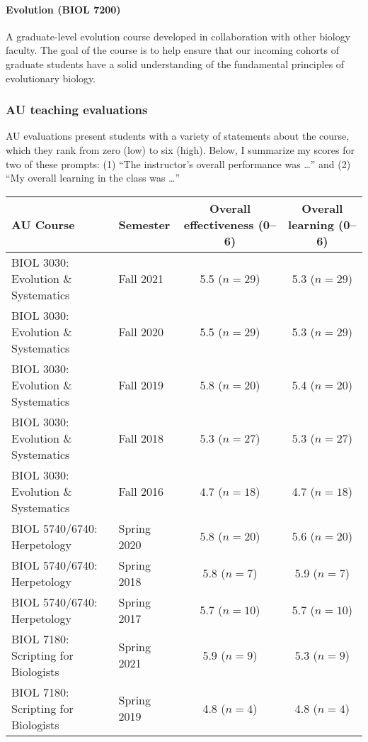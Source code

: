 \paragraph*{Evolution (BIOL 7200)}
A graduate-level evolution course developed in collaboration with other biology
faculty.
The goal of the course is to help ensure that our incoming cohorts of graduate
students have a solid understanding of the fundamental principles of
evolutionary biology.

\subsubsection*{AU teaching evaluations}
AU evaluations present students with a variety of statements about the
course,
which they rank from zero (low) to six (high).
Below, I summarize my scores for two of these prompts:
(1) ``The instructor's overall performance was \ldots''
and
(2) ``My overall learning in the class was \ldots''
\vspace{0.1ex}
\begin{center}
    \sffamily\footnotesize
\begin{tabular}{l l c c}
    \hline
    \textbf{AU Course} & \textbf{Semester} & \textbf{Overall effectiveness} (0--6) & \textbf{Overall learning} (0--6) \\
    \hline
    BIOL 3030: Evolution \& Systematics & Fall 2021 & 5.5 ($n = 29$) & 5.3 ($n = 29$) \\
    BIOL 3030: Evolution \& Systematics & Fall 2020 & 5.5 ($n = 29$) & 5.3 ($n = 29$) \\
    BIOL 3030: Evolution \& Systematics & Fall 2019 & 5.8 ($n = 20$) & 5.4 ($n = 20$) \\
    BIOL 3030: Evolution \& Systematics & Fall 2018 & 5.3 ($n = 27$) & 5.3 ($n = 27$) \\
    BIOL 3030: Evolution \& Systematics & Fall 2016 & 4.7 ($n = 18$) & 4.7 ($n = 18$) \\
    \hline
    BIOL 5740/6740: Herpetology & Spring 2020 & 5.8 ($n = 20$) & 5.6 ($n = 20$) \\
    BIOL 5740/6740: Herpetology & Spring 2018 & 5.8 ($n = 7$) & 5.9 ($n = 7$) \\
    BIOL 5740/6740: Herpetology & Spring 2017 & 5.7 ($n = 10$) & 5.7 ($n = 10$) \\
    \hline
    BIOL 7180: Scripting for Biologists & Spring 2021 & 5.9 ($n = 9$) & 5.3 ($n = 9$) \\
    BIOL 7180: Scripting for Biologists & Spring 2019 & 4.8 ($n = 4$) & 4.8 ($n = 4$) \\
    \hline
\end{tabular}
\end{center}

